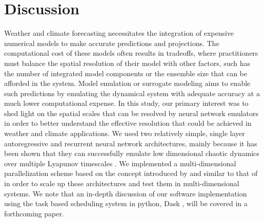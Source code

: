 \section{Discussion}
\label{sec:discussion}

Weather and climate forecasting necessitates the integration of expensive
numerical models to make accurate predictions and projections.
The computational cost of these models often results in tradeoffs, where
practitioners must balance the spatial resolution of their model with other
factors, such has the number of integrated model components or the ensemble
size that can be afforded in the system.
Model emulation or surrogate modeling aims to enable such predictions
by emulating the dynamical system with adequate accuracy at a much lower
computational expense.
In this study, our primary interest was to shed light on the spatial scales
that can be resolved by neural network emulators in order to better
understand the effective resolution that could be achieved in weather and
climate applications.
We used two relatively simple, single layer autoregressive and recurrent neural
network architectures, mainly because it has been shown that they can
successfully emulate low dimensional chaotic dynamics over multiple Lyapunov
timescales
\citep{platt_systematic_2022,vlachas_backpropagation_2020,pathak_using_2017,gauthier_next_2021}.
We implemented a multi-dimensional parallelization scheme based on the concept
introduced by \citet{pathak_model-free_2018} and similar to that of
\citet{arcomano_machine_2020}
in order to scale up these architectures and test them in multi-dimensional
systems.
We note that an in-depth discussion of our software implementation using the
task based scheduling system in python, Dask \citep{dask_2016}, will be covered in a
forthcoming paper.

